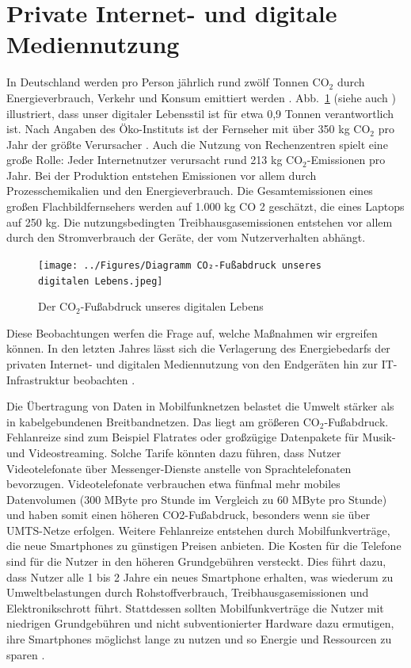 \documentclass{article}
\begin{document}
\section{Private Internet- und digitale Mediennutzung}
In Deutschland werden  pro Person jährlich rund zwölf Tonnen CO$_2$ durch Energieverbrauch, Verkehr und Konsum  emittiert werden \cite{energieeffizienz_IT_2020}. 
Abb.~\ref{fig:DiagrammCO2Fuss} (siehe auch \cite{infografik_DigFuss_2022}) illustriert, dass  unser digitaler Lebensstil ist für etwa 0,9 Tonnen verantwortlich ist. Nach Angaben des Öko-Instituts ist der Fernseher mit über 350 kg CO$_2$ pro Jahr der größte Verursacher \cite{energieeffizienz_IT_2020}. Auch die Nutzung von Rechenzentren spielt eine große Rolle: Jeder Internetnutzer verursacht rund 213 kg CO$_2$-Emissionen pro Jahr.
Bei der Produktion entstehen Emissionen vor allem durch Prozesschemikalien und den Energieverbrauch. Die Gesamtemissionen eines großen Flachbildfernsehers werden auf 1.000 kg CO 2 geschätzt, die eines Laptops auf 250 kg.
Die nutzungsbedingten Treibhausgasemissionen entstehen vor allem durch den Stromverbrauch der Geräte, der vom Nutzerverhalten abhängt\cite{energieeffizienz_IT_2020}. 

\begin{figure}[h]
	\centering
		\texttt{[image: ../Figures/Diagramm CO₂-Fußabdruck unseres digitalen Lebens.jpeg]}	
	\caption{\label{fig:DiagrammCO2Fuss} Der CO$_2$-Fußabdruck unseres digitalen Lebens}
\end{figure}


Diese Beobachtungen werfen die Frage auf, welche Maßnahmen wir ergreifen können.
In den letzten Jahres lässt sich die Verlagerung
des Energiebedarfs der privaten Internet- und digitalen Mediennutzung
von den Endgeräten hin zur IT-Infrastruktur beobachten \cite{grunwald_energieverbrauch_2022}. 

Die Übertragung von Daten in Mobilfunknetzen belastet die Umwelt stärker als in kabelgebundenen Breitbandnetzen. Das liegt am größeren CO$_2$-Fußabdruck. 
Fehlanreize sind zum Beispiel Flatrates oder großzügige Datenpakete für Musik- und Videostreaming. Solche Tarife könnten dazu führen, dass Nutzer Videotelefonate über Messenger-Dienste anstelle von Sprachtelefonaten bevorzugen. Videotelefonate verbrauchen etwa fünfmal mehr mobiles Datenvolumen (300 MByte pro Stunde im Vergleich zu 60 MByte pro Stunde) und haben somit einen höheren CO2-Fußabdruck, besonders wenn sie über UMTS-Netze erfolgen.
Weitere Fehlanreize entstehen durch Mobilfunkverträge, die neue Smartphones zu günstigen Preisen anbieten. Die Kosten für die Telefone sind für die Nutzer in den höheren Grundgebühren versteckt. Dies führt dazu, dass Nutzer alle 1 bis 2 Jahre ein neues Smartphone erhalten, was wiederum zu Umweltbelastungen durch Rohstoffverbrauch, Treibhausgasemissionen und Elektronikschrott führt. Stattdessen sollten Mobilfunkverträge die Nutzer mit niedrigen Grundgebühren und nicht subventionierter Hardware dazu ermutigen, ihre Smartphones möglichst lange zu nutzen und so Energie und Ressourcen zu sparen \cite{energieeffizienz_IT_2020}.
\end{document}
